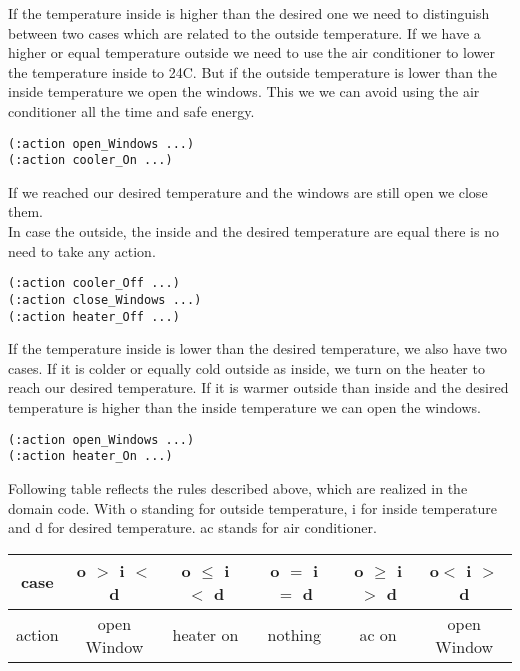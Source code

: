 \documentclass[runningheads]{llncs}
\begin{document}
If the temperature inside is higher than the desired one we need to distinguish between two cases which are related to the outside temperature. If we have a higher or equal temperature outside we need to use the air conditioner to lower the temperature inside to 24C. But if the outside temperature is lower than the inside temperature we open the windows. This we we can avoid using the air conditioner all the time and safe energy.
\begin{lstlisting}
(:action open_Windows ...)
(:action cooler_On ...)
\end{lstlisting}
If we reached our desired temperature and the windows are still open we close them. \\
In case the outside, the inside and the desired temperature are equal there is no need to take any action.
\begin{lstlisting}
(:action cooler_Off ...)
(:action close_Windows ...)
(:action heater_Off ...)
\end{lstlisting}
If the temperature inside is lower than the desired temperature, we also have two cases. If it is colder or equally cold outside as inside, we turn on the heater to reach our desired temperature. If it is warmer outside than inside and the desired temperature is higher than the inside temperature we can open the windows.
\begin{lstlisting}
(:action open_Windows ...)
(:action heater_On ...)
\end{lstlisting}
Following table reflects the rules described above, which are realized in the domain code. With o standing for outside temperature, i for inside temperature and d for desired temperature. ac stands for air conditioner.\\

\begin{tabular}{|c |c |c| c|c|c|}
\hline
case &o $>$ i $<$ d & o $\leq$ i $<$ d & o $=$ i $=$ d & o $\geq$ i $>$ d & o$ <$ i $>$ d \\
\hline
action &open Window & heater on & nothing& ac on& open Window\\
\hline 
\end{tabular}\\
\end{document}
